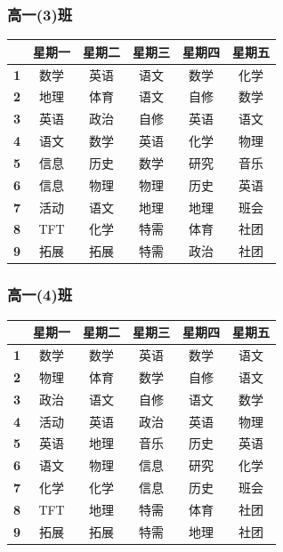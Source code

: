 \documentclass[a4paper]{article}
\begin{document}
  \subsubsection{高一(3)班}
   \begin{tabular}{|c|c|c|c|c|c|}
   \hline
   & \bf 星期一 & \bf 星期二 & \bf 星期三 & \bf 星期四 & \bf 星期五 \\\hline
   \bf 1 & 数学 & 英语 & 语文 & 数学 & 化学 \\\hline
   \bf 2 & 地理 & 体育 & 语文 & 自修 & 数学 \\\hline
   \bf 3 & 英语 & 政治 & 自修 & 英语 & 语文 \\\hline
   \bf 4 & 语文 & 数学 & 英语 & 化学 & 物理 \\\hline
   \bf 5 & 信息 & 历史 & 数学 & 研究 & 音乐 \\\hline
   \bf 6 & 信息 & 物理 & 物理 & 历史 & 英语 \\\hline
   \bf 7 & 活动 & 语文 & 地理 & 地理 & 班会 \\\hline
   \bf 8 & TFT  & 化学 & 特需 & 体育 & 社团 \\\hline
   \bf 9 & 拓展 & 拓展 & 特需 & 政治 & 社团 \\\hline
   \end{tabular}
  \clearpage
  \subsubsection{高一(4)班}
   \begin{tabular}{|c|c|c|c|c|c|}
   \hline
   & \bf 星期一 & \bf 星期二 & \bf 星期三 & \bf 星期四 & \bf 星期五 \\\hline
   \bf 1 & 数学 & 数学 & 英语 & 数学 & 语文 \\\hline
   \bf 2 & 物理 & 体育 & 数学 & 自修 & 语文 \\\hline
   \bf 3 & 政治 & 语文 & 自修 & 语文 & 数学 \\\hline
   \bf 4 & 活动 & 英语 & 政治 & 英语 & 物理 \\\hline
   \bf 5 & 英语 & 地理 & 音乐 & 历史 & 英语 \\\hline
   \bf 6 & 语文 & 物理 & 信息 & 研究 & 化学 \\\hline
   \bf 7 & 化学 & 化学 & 信息 & 历史 & 班会 \\\hline
   \bf 8 & TFT  & 地理 & 特需 & 体育 & 社团 \\\hline
   \bf 9 & 拓展 & 拓展 & 特需 & 地理 & 社团 \\\hline
   \end{tabular}
\end{document}
